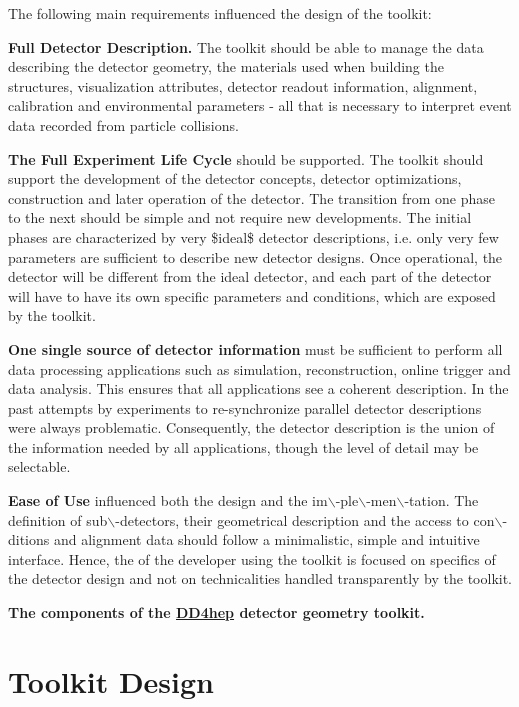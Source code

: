 The following main requirements influenced the design of the toolkit:


\begin{DoxyItemize}
\item {\bfseries Full Detector Description.} The toolkit should be able to manage the data describing the detector geometry, the materials used when building the structures, visualization attributes, detector readout information, alignment, calibration and environmental parameters -\/ all that is necessary to interpret event data recorded from particle collisions.
\item {\bfseries The Full Experiment Life Cycle} should be supported. The toolkit should support the development of the detector concepts, detector optimizations, construction and later operation of the detector. The transition from one phase to the next should be simple and not require new developments. The initial phases are characterized by very \$ideal\$ detector descriptions, i.e. only very few parameters are sufficient to describe new detector designs. Once operational, the detector will be different from the ideal detector, and each part of the detector will have to have its own specific parameters and conditions, which are exposed by the toolkit.
\item {\bfseries One single source of detector information} must be sufficient to perform all data processing applications such as simulation, reconstruction, online trigger and data analysis. This ensures that all applications see a coherent description. In the past attempts by experiments to re-\/synchronize parallel detector descriptions were always problematic. Consequently, the detector description is the union of the information needed by all applications, though the level of detail may be selectable.
\item {\bfseries Ease of Use} influenced both the design and the im$\backslash$-\/ple$\backslash$-\/men$\backslash$-\/tation. The definition of sub$\backslash$-\/detectors, their geometrical description and the access to con$\backslash$-\/ditions and alignment data should follow a minimalistic, simple and intuitive interface. Hence, the of the developer using the toolkit is focused on specifics of the detector design and not on technicalities handled transparently by the toolkit.
\end{DoxyItemize} {\bfseries The components of the \hyperlink{namespace_d_d4hep}{DD4hep} detector geometry toolkit.}\hypertarget{index_DESIGN}{}\section{Toolkit Design}\label{index_DESIGN}
